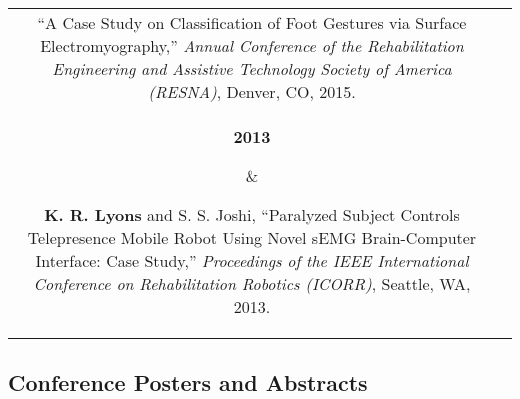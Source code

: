 \documentclass[10pt]{article}
\newcommand\LColRaw[3]{\parbox[t]{#1}{
    \raggedleft%
    {\bf#2}\\
    {\small\color{darkgray}#3}}
}
\newcommand\LCol[2]{\LColRaw{1.3in}{#1}{#2}}
\newcommand\RCol[1]{\parbox[t]{6in}{#1}}
\begin{document}
\begin{longtable}{cc}
{        ``A Case Study on Classification of Foot Gestures via Surface
            Electromyography,''
        \emph{Annual Conference of the Rehabilitation Engineering and Assistive
            Technology Society of America (RESNA)},
        Denver, CO,
        2015.}\\
    \LCol{2013}{} & \RCol{%
        \textbf{K. R. Lyons} and S. S. Joshi,
        ``Paralyzed Subject Controls Telepresence Mobile Robot Using Novel
            {sEMG} Brain-Computer Interface: Case Study,''
        \emph{Proceedings of the IEEE International Conference on
            Rehabilitation Robotics (ICORR)},
        Seattle, WA,
        2013.}\\
\end{longtable}

\subsection*{Conference Posters and Abstracts}
\end{document}
